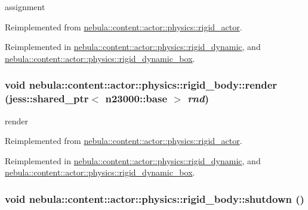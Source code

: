 assignment 

Reimplemented from \hyperlink{classnebula_1_1content_1_1actor_1_1physics_1_1rigid__actor_aa3d6e979793753e37b9b95b118e40c67}{nebula::content::actor::physics::rigid\_\-actor}.

Reimplemented in \hyperlink{classnebula_1_1content_1_1actor_1_1physics_1_1rigid__dynamic_a115e82dbc90ce5ae9f8d41724f1bd44d}{nebula::content::actor::physics::rigid\_\-dynamic}, and \hyperlink{classnebula_1_1content_1_1actor_1_1physics_1_1rigid__dynamic__box_a26c54eacc3d28dd0b88e7a67fe6635f7}{nebula::content::actor::physics::rigid\_\-dynamic\_\-box}.\hypertarget{classnebula_1_1content_1_1actor_1_1physics_1_1rigid__body_a60e13499d8c37d216d3f25415ef33041}{
\subsubsection[{render}]{\setlength{\rightskip}{0pt plus 5cm}void nebula::content::actor::physics::rigid\_\-body::render (jess::shared\_\-ptr$<$ {\bf n23000::base} $>$ {\em rnd})}}
\label{classnebula_1_1content_1_1actor_1_1physics_1_1rigid__body_a60e13499d8c37d216d3f25415ef33041}


render 

Reimplemented from \hyperlink{classnebula_1_1content_1_1actor_1_1physics_1_1rigid__actor_af9f27bb90193c5a85a3572ef15009bf7}{nebula::content::actor::physics::rigid\_\-actor}.

Reimplemented in \hyperlink{classnebula_1_1content_1_1actor_1_1physics_1_1rigid__dynamic_a24bc7fc5707d3d387e57d0516f1cbd0e}{nebula::content::actor::physics::rigid\_\-dynamic}, and \hyperlink{classnebula_1_1content_1_1actor_1_1physics_1_1rigid__dynamic__box_a4125f63982e9dfee274ab2721893bc28}{nebula::content::actor::physics::rigid\_\-dynamic\_\-box}.\hypertarget{classnebula_1_1content_1_1actor_1_1physics_1_1rigid__body_a99b70594f437d666ec7ee33e4d36c964}{
\subsubsection[{shutdown}]{\setlength{\rightskip}{0pt plus 5cm}void nebula::content::actor::physics::rigid\_\-body::shutdown ()}}
\label{classnebula_1_1content_1_1actor_1_1physics_1_1rigid__body_a99b70594f437d666ec7ee33e4d36c964}


